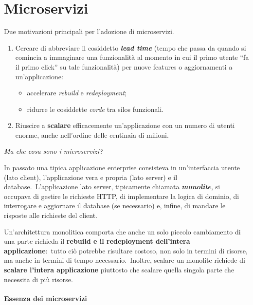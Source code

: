 \chapter{Microservizi}

Due motivazioni principali per l'adozione di microservizi.\

\begin{enumerate}
	\item Cercare di abbreviare il cosiddetto \textbf{\textit{lead time}} (tempo che passa da quando si comincia a immaginare una funzionalità al momento in cui il primo utente ``fa il primo click'' su tale funzionalità) per nuove features o aggiornamenti a un'applicazione:
	      \begin{itemize}
		      \item accelerare \textit{rebuild} e \textit{redeployment};
		      \item ridurre le cosiddette \textit{corde} tra silos funzionali.
	      \end{itemize}
	\item Riuscire a \textbf{scalare} efficacemente un'applicazione con un numero di utenti enorme, anche nell'ordine delle centinaia di milioni.\
\end{enumerate}

\begin{center}
	\textit{Ma che cosa sono i microservizi?}
\end{center}

\noindent In passato una tipica applicazione enterprise consisteva in un'interfaccia utente (lato client), l'applicazione vera e propria (lato server) e il database.\
L'applicazione lato server, tipicamente chiamata \textbf{\textit{monolite}}, si occupava di gestire le richieste HTTP, di implementare la logica di dominio, di interrogare e aggiornare il database (se necessario) e, infine, di mandare le risposte alle richieste del client.\

Un'architettura monolitica comporta che anche un solo piccolo cambiamento di una parte richieda il \textbf{rebuild e il redeployment dell'intera applicazione}:\ tutto ciò potrebbe risultare costoso, non solo in termini di risorse, ma anche in termini di tempo necessario.\
Inoltre, scalare un monolite richiede di \textbf{scalare l'intera applicazione} piuttosto che scalare quella singola parte che necessita di più risorse.\

\subsubsection{Essenza dei microservizi}


